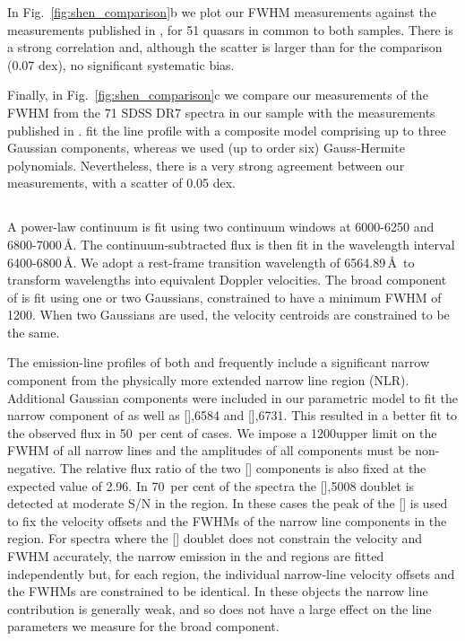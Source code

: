 In Fig.~\ref{fig:shen_comparison}b we plot our \ha FWHM measurements against the measurements published in \citet{shen12}, for 51 quasars in common to both samples.
There is a strong correlation and, although the scatter is larger than for the \hb comparison (0.07 dex), no significant systematic bias. 

Finally, in Fig.~\ref{fig:shen_comparison}c we compare our measurements of the  FWHM from the 71 SDSS DR7 spectra in our sample with the measurements published in \citet{shen11}. 
\citet{shen11} fit the  line profile with a composite model comprising up to three Gaussian components, whereas we used (up to order six) Gauss-Hermite polynomials. 
Nevertheless, there is a very strong agreement between our measurements, with a scatter of 0.05 dex. 

\subsection{\ha}

A power-law continuum is fit using two continuum windows at 6000-6250 and 6800-7000\,\AA. 
The continuum-subtracted flux is then fit in the wavelength interval 6400-6800\,\AA. 
We adopt a rest-frame transition wavelength of 6564.89\,\AA\, to transform wavelengths into equivalent Doppler velocities. 
The broad component of \ha is fit using one or two Gaussians, constrained to have a minimum FWHM of 1200\kms. When two Gaussians are used, the velocity centroids are constrained to be the same.

The emission-line profiles of both \hb and \ha frequently include a significant narrow component from the physically more extended narrow line region (NLR). 
Additional Gaussian components were included in our parametric model to fit the narrow component of \ha as well as [],6584 and [],6731.
This resulted in a better fit to the observed flux in 50\, per cent of cases. 
We impose a 1200\kms upper limit on the FWHM of all narrow lines and the amplitudes of all components must be non-negative.
The relative flux ratio of the two [] components is also fixed at the expected value of 2.96.
In 70\, per cent of the spectra the [],5008 doublet is detected at moderate S/N in the \hb region. 
In these cases the peak of the [] is used to fix the velocity offsets and the FWHMs of the narrow line components in the \ha region.  
For spectra where the [] doublet does not constrain the velocity and FWHM accurately, the narrow emission in the \ha and \hb regions are fitted independently but, for each region, the individual narrow-line velocity offsets and the FWHMs are constrained to be identical. 
In these objects the narrow line contribution is generally weak, and so does not have a large effect on the line parameters we measure for the broad component.   

